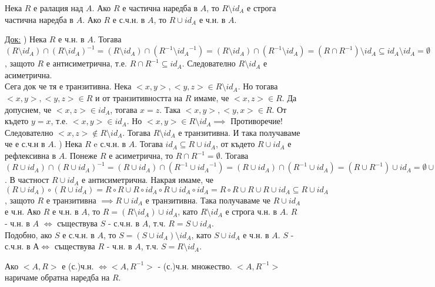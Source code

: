 \documentclass[fleqn, titlepage, 12pt]{report}
\begin{document}
 Нека $R$ е ралация над $A$. Ако $R$ е частична наредба в $A$, то $R \setminus id_A$ е строга частична наредба
в $A$. Ако $R$ е с.ч.н. в $A$, то $R \cup id_A$ е ч.н. в $A$.
\bigbreak

\underline{Док:}
) Нека $R$ е ч.н. в $A$.
Тогава $(R \setminus id_A) \cap (R \setminus id_A)^{-1} = (R \setminus id_A) \cap (R^{-1} \setminus {id_A}^{-1})
= (R \setminus id_A) \cap (R^{-1} \setminus id_A) = (R \cap R^{-1}) \setminus id_A \subseteq id_A \setminus id_A
= \emptyset$, защото $R$ е антисиметрична, т.е. $R \cap R^{-1} \subseteq id_A$.
Следователно $R \setminus id_A$ е асиметрична.\\
Сега док че тя е транзитивна. Нека $<x,y>, <y,z> \in R \setminus id_A$. Но тогава $<x,y>, <y,z> \in R$ и от
транзитивността на $R$ имаме, че $<x,z> \in R$. Да допуснем, че $<x,z> \in id_A$, тогава $x = z$.
Така $<x,y>, <y,x> \in R$. От където $y = x$, т.е. $<x,y> \in id_A$.
Но $<x,y> \in R \setminus id_A \implies$ Противоречие! Следователно $<x,z> \notin R \setminus id_A$.
Тогава $R \setminus id_A$ е транзитивна. И така получаваме че е с.ч.н в $A$.
) Нека $R$ e с.ч.н. в $A$. Тогава $id_A \subseteq R \cup id_A$, от където $R \cup id_A$ е рефлексивна в $A$.
Понеже $R$ е асиметрична, то $R \cap R^{-1} = \emptyset$.
Тогава $(R \cup id_A) \cap (R \cup id_A)^{-1} = (R \cup id_A) \cap (R^{-1} \cup {id_A}^{-1})
= (R \cup id_A) \cap (R^{-1} \cup id_A) = (R \cup R^{-1}) \cup id_A = \emptyset \cup id_A = id_A$.
В частност $R \cup id_A$ е антисиметрична. Накрая имаме,
че $(R \cup id_A) \circ (R \cup id_A) = R \circ R \cup R \circ id_A \circ R \cup id_A \circ id_A
= R \circ R \cup R \cup R \cup id_A \subseteq R \cup id_A$,
защото $R$ е транзитивна $\implies R \cup id_A$ е транзитивна. Така получаваме че $R \cup id_A$ е ч.н.
\bigbreak
Ако $R$ е ч.н. в $A$, то $R = (R \setminus id_A) \cup id_A$, като $R \setminus id_A$ е строга ч.н. в $A$.
$R$ - ч.н. в $A$ $\Longleftrightarrow $ съществува $S$ - с.ч.н. в $A$, т.ч. $R = S \cup id_A$.\\
Подобно, ако $S$ е с.ч.н. в $A$, то $S = (S \cup id_A) \setminus id_A$, като $S \cup id_A$ е ч.н. в $A$.
$S$ - с.ч.н. в $А \Longleftrightarrow $  съществува $R$ - ч.н. в $A$, т.ч. $S = R \setminus id_A$.
\bigbreak

 Ако $<A,R>$ е (с.)ч.н. $\Longleftrightarrow <A,R^{-1}>$ - (с.)ч.н. множество.
$<A,R^{-1}>$ наричаме обратна наредба на $R$.
\bigbreak
\end{document}
